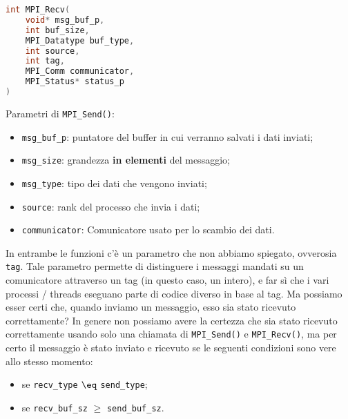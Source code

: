 \begin{codedefine}
    \begin{lstlisting}[language = C, numbers = none]
int MPI_Recv(
    void* msg_buf_p,
    int buf_size,
    MPI_Datatype buf_type,
    int source,
    int tag,
    MPI_Comm communicator,
    MPI_Status* status_p
)\end{lstlisting}
    \manlower    
    Parametri di \verb|MPI_Send()|:
    \begin{itemize}
        \item \verb|msg_buf_p|: puntatore del buffer in cui verranno salvati i dati inviati;
        \item \verb|msg_size|: grandezza \textbf{in elementi} del messaggio;
        \item \verb|msg_type|: tipo dei dati che vengono inviati;
        \item \verb|source|: rank del processo che invia i dati;
        \item \verb|communicator|: Comunicatore usato per lo scambio dei dati.
    \end{itemize}
\end{codedefine}

In entrambe le funzioni c'è un parametro che non abbiamo spiegato, ovverosia \verb|tag|. Tale parametro permette di distinguere i messaggi mandati su un comunicatore attraverso un tag (in questo caso, un intero), e far sì che i vari processi / threads eseguano parte di codice diverso in base al tag.
\nl
Ma possiamo esser certi che, quando inviamo un messaggio, esso sia stato ricevuto correttamente? In genere non possiamo avere la certezza che sia stato ricevuto correttamente usando solo una chiamata di \verb|MPI_Send()| e \verb|MPI_Recv()|, ma per certo il messaggio è stato inviato e ricevuto se le seguenti condizioni sono vere allo stesso momento:
\begin{itemize}
    \item se \verb|recv_type| $\eq$ \verb|send_type|;
    \item se \verb|recv_buf_sz| $\geq$ \verb|send_buf_sz|.
\end{itemize}

